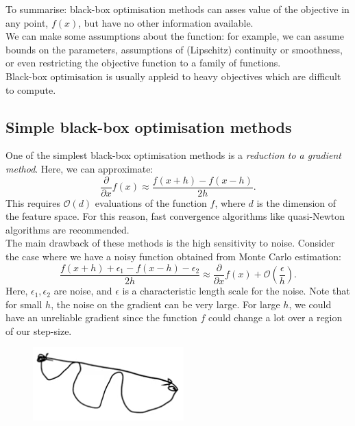 To summarise: black-box optimisation methods can asses value of the objective in any point, $f(x)$, but have no other information available.\\

We can make some assumptions about the function: for example, we can assume bounds on the parameters, assumptions of (Lipschitz) continuity or smoothness, or even restricting the objective function to a family of functions.\\

Black-box optimisation is usually appleid to heavy objectives which are difficult to compute.



\newpage
\subsection{Simple black-box optimisation methods}
One of the simplest black-box optimisation methods is a \textit{reduction to a gradient method}. Here, we can approximate:
\begin{equation*}
\frac{\partial}{\partial x} f(x) \approx \frac{f(x+h) - f(x-h)}{2h}.
\end{equation*}
This requires $\mathcal{O}(d)$ evaluations of the function $f$, where $d$ is the dimension of the feature space. For this reason, fast convergence algorithms like quasi-Newton algorithms are recommended.\\

The main drawback of these methods is the high sensitivity to noise. Consider the case where we have a noisy function obtained from Monte Carlo estimation:
\begin{equation*}
\frac{f(x+h) + \epsilon_1 - f(x-h) - \epsilon_2}{2h} \approx \frac{\partial}{\partial x} f(x) + \mathcal{O}\left( \frac{\epsilon}{h} \right).
\end{equation*}
Here, $\epsilon_1, \epsilon_2$ are noise, and $\epsilon$ is a characteristic length scale for the noise. Note that for small $h$, the noise on the gradient can be very large. For large $h$, we could have an unreliable gradient since the function $f$ could change a lot over a region of our step-size.
\begin{figure}[H]
\centering
\includegraphics[scale=0.4]{largeh.png}
\end{figure}

